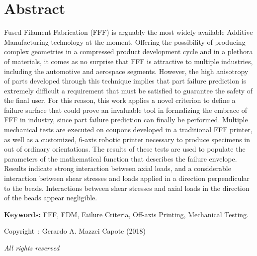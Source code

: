 \documentclass[main.tex]{subfiles}
\begin{document}
\setcounter{page}{1}
\chapter*{Abstract}
Fused Filament Fabrication (FFF) is arguably the most widely available Additive Manufacturing technology at the moment. Offering the possibility of producing complex geometries in a compressed product development cycle and in a plethora of materials, it comes as no surprise that FFF is attractive to multiple industries, including the automotive and aerospace segments. However, the high anisotropy of parts developed through this technique implies that part failure prediction is extremely difficult \textemdash a requirement that must be satisfied to guarantee the safety of the final user. For this reason, this work applies a novel criterion to define a failure surface that could prove an invaluable tool in formalizing the embrace of FFF in industry, since part failure prediction can finally be performed. Multiple mechanical tests are executed on coupons developed in a traditional FFF printer, as well as a customized, 6-axis robotic printer necessary to produce specimens in out of ordinary orientations. The results of these tests are used to populate the parameters of the mathematical function that describes the failure envelope. Results indicate strong interaction between axial loads, and a considerable interaction between shear stresses and loads applied in a direction perpendicular to the beads. Interactions between shear stresses and axial loads in the direction of the beads appear negligible.
 
\vspace{10mm} %
\textbf{Keywords:} FFF, FDM, Failure Criteria, Off-axis Printing, Mechanical Testing.

\vfill %
\begin{center}
Copyright~\textcopyright: Gerardo A. Mazzei Capote (2018)

\emph{All rights reserved}	
\end{center}
\end{document}
